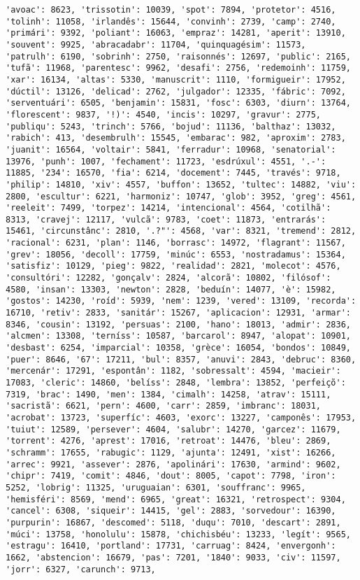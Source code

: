 \documentclass[11pt]{article}
\begin{document}
\begin{Verbatim}[commandchars=\\\{\}]
'avoac': 8623, 'trissotin': 10039, 'spot': 7894, 'protetor': 4516, 'tolinh': 11058, 'irlandês': 15644, 'convinh': 2739, 'camp': 2740, 'primári': 9392, 'poliant': 16063, 'empraz': 14281, 'aperit': 13910, 'souvent': 9925, 'abracadabr': 11704, 'quinquagésim': 11573, 'patrulh': 6190, 'sobrinh': 2750, 'raisonnés': 12697, 'public': 2165, 'tufã': 11968, 'parentesc': 9962, 'desafi': 2756, 'redemoinh': 11759, 'xar': 16134, 'altas': 5330, 'manuscrit': 1110, 'formigueir': 17952, 'dúctil': 13126, 'delicad': 2762, 'julgador': 12335, 'fábric': 7092, 'serventuári': 6505, 'benjamin': 15831, 'fosc': 6303, 'diurn': 13764, 'florescent': 9837, '!)': 4540, 'incis': 10297, 'gravur': 2775, 'publiqu': 5243, 'trinch': 5766, 'bojud': 11136, 'balthaz': 13032, 'rabich': 413, 'desembrulh': 15545, 'embarac': 982, 'aproxim': 2783, 'juanit': 16564, 'voltair': 5841, 'ferradur': 10968, 'senatorial': 13976, 'punh': 1007, 'fechament': 11723, 'esdrúxul': 4551, '.-': 11885, '234': 16570, 'fia': 6214, 'docement': 7445, 'través': 9718, 'philip': 14810, 'xiv': 4557, 'buffon': 13652, 'tultec': 14882, 'viu': 2800, 'escultur': 6221, 'harmoniz': 10747, 'glob': 3952, 'greg': 4561, 'reeleit': 7499, 'torpez': 14214, 'intencional': 4564, 'cotilhã': 8313, 'cravej': 12117, 'vulcã': 9783, 'coet': 11873, 'entrarás': 15461, 'circunstânc': 2810, '.?"': 4568, 'var': 8321, 'tremend': 2812, 'racional': 6231, 'plan': 1146, 'borrasc': 14972, 'flagrant': 11567, 'grev': 18056, 'decoll': 17759, 'minúc': 6553, 'nostradamus': 15364, 'satisfiz': 10129, 'pieg': 9822, 'realidad': 2821, 'molecot': 4576, 'consultóri': 12282, 'gonçalv': 2824, 'alcorã': 10802, 'filósof': 4580, 'insan': 13303, 'newton': 2828, 'beduín': 14077, 'è': 15982, 'gostos': 14230, 'roíd': 5939, 'nem': 1239, 'vered': 13109, 'recorda': 16710, 'retiv': 2833, 'sanitár': 15267, 'aplicacion': 12931, 'armar': 8346, 'cousin': 13192, 'persuas': 2100, 'hano': 18013, 'admir': 2836, 'alcmen': 13308, 'terníss': 10587, 'barcarol': 8947, 'alopat': 10901, 'desbast': 6254, 'imparcial': 10358, 'grèce': 16054, 'bondos': 10849, 'puer': 8646, '67': 17211, 'bul': 8357, 'anuvi': 2843, 'debruc': 8360, 'mercenár': 17291, 'espontân': 1182, 'sobressalt': 4594, 'macieir': 17083, 'cleric': 14860, 'belíss': 2848, 'lembra': 13852, 'perfeiçõ': 7319, 'brac': 1490, 'men': 1384, 'cimalh': 14258, 'atrav': 15111, 'sacristã': 6621, 'pern': 4600, 'carr': 2859, 'imbranc': 18031, 'acrobat': 13723, 'superfíc': 4603, 'exorc': 13227, 'camponês': 17953, 'tuiut': 12589, 'persever': 4604, 'salubr': 14270, 'garcez': 11679, 'torrent': 4276, 'aprest': 17016, 'retroat': 14476, 'bleu': 2869, 'schramm': 17655, 'rabugic': 1129, 'ajunta': 12491, 'xist': 16266, 'arrec': 9921, 'assever': 2876, 'apolinári': 17630, 'armind': 9602, 'chipr': 7419, 'comit': 4846, 'dout': 8005, 'capot': 7798, 'iron': 5252, 'lobrig': 11325, 'uruguaian': 6301, 'souffranc': 9965, 'hemisféri': 8569, 'mend': 6965, 'great': 16321, 'retrospect': 9304, 'cancel': 6308, 'siqueir': 14415, 'gel': 2883, 'sorvedour': 16390, 'purpurin': 16867, 'descomed': 5118, 'duqu': 7010, 'descart': 2891, 'múci': 13758, 'honolulu': 15878, 'chichisbéu': 13233, 'legít': 9565, 'estragu': 16410, 'portland': 17731, 'carruag': 8424, 'envergonh': 1662, 'abstencion': 16679, 'pas': 7201, '1840': 9033, 'civ': 11597, 'jorr': 6327, 'carunch': 9713, 
\end{Verbatim}
\end{document}
